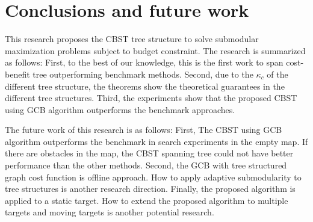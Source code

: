\chapter{Conclusions and future work}
This research proposes the CBST tree structure to solve submodular maximization problems subject to budget constraint.
The research is summarized as follows:
First, to the best of our knowledge, this is the first work to span cost-benefit tree outperforming benchmark methods.
Second, due to the $\kappa_c$ of the different tree structure, the theorems show the theoretical guarantees in the different tree structures.
Third, the experiments show that the proposed CBST using GCB algorithm outperforms the benchmark approaches.

The future work of this research is as follows:
First, The CBST using GCB algorithm outperforms the benchmark in search experiments in the empty map.
If there are obstacles in the map, the CBST spanning tree could not have better performance than the other methods.
Second, the GCB with tree structured graph cost function is offline approach.
How to apply adaptive submodularity to tree structures is another research direction.
Finally, the proposed algorithm is applied to a static target.
How to extend the proposed algorithm to multiple targets and moving targets is another potential research.